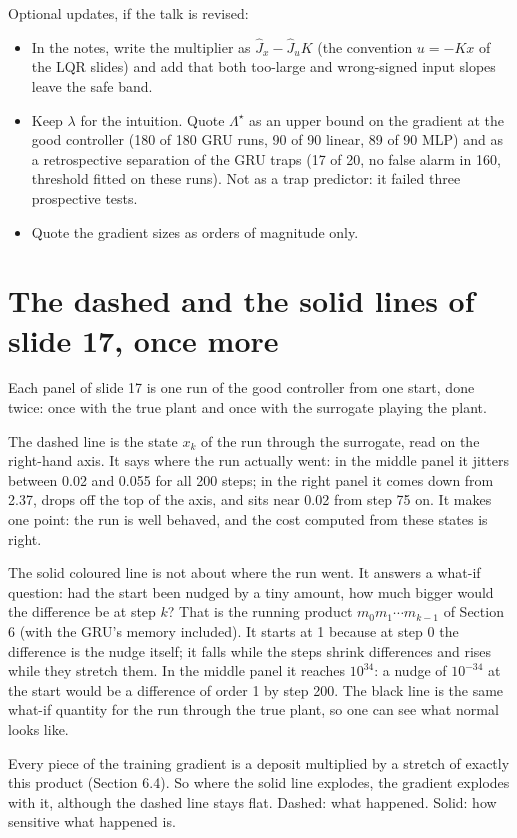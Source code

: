 \documentclass[11pt]{article}
\begin{document}
Optional updates, if the talk is revised:
\begin{itemize}
\item In the notes, write the multiplier as $\hat J_x-\hat J_uK$ (the convention $u=-Kx$ of the LQR slides) and add that both too-large and wrong-signed input slopes leave the safe band.
\item Keep $\lambda$ for the intuition. Quote $\Lambda^\star$ as an upper bound on the gradient at the good controller (180 of 180 GRU runs, 90 of 90 linear, 89 of 90 MLP) and as a retrospective separation of the GRU traps (17 of 20, no false alarm in 160, threshold fitted on these runs). Not as a trap predictor: it failed three prospective tests.
\item Quote the gradient sizes as orders of magnitude only.
\end{itemize}

\section{The dashed and the solid lines of slide 17, once more}

Each panel of slide 17 is one run of the good controller from one start, done twice: once with the true plant and once with the surrogate playing the plant.

The dashed line is the state $x_k$ of the run through the surrogate, read on the right-hand axis. It says where the run actually went: in the middle panel it jitters between 0.02 and 0.055 for all 200 steps; in the right panel it comes down from 2.37, drops off the top of the axis, and sits near 0.02 from step 75 on. It makes one point: the run is well behaved, and the cost computed from these states is right.

The solid coloured line is not about where the run went. It answers a what-if question: had the start been nudged by a tiny amount, how much bigger would the difference be at step $k$? That is the running product $m_0 m_1\cdots m_{k-1}$ of Section 6 (with the GRU's memory included). It starts at 1 because at step 0 the difference is the nudge itself; it falls while the steps shrink differences and rises while they stretch them. In the middle panel it reaches $10^{34}$: a nudge of $10^{-34}$ at the start would be a difference of order 1 by step 200. The black line is the same what-if quantity for the run through the true plant, so one can see what normal looks like.

Every piece of the training gradient is a deposit multiplied by a stretch of exactly this product (Section 6.4). So where the solid line explodes, the gradient explodes with it, although the dashed line stays flat. Dashed: what happened. Solid: how sensitive what happened is.
\end{document}
